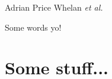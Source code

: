 \documentclass[12pt]{article}
\date{}
\author{}
\begin{document}
\maketitle
\begin{center}{Adrian Price Whelan \textit{et al.}}\end{center}\vspace{-1.75ex}

Some words yo!

\section{Some stuff...}


% 
% 
\end{document}

